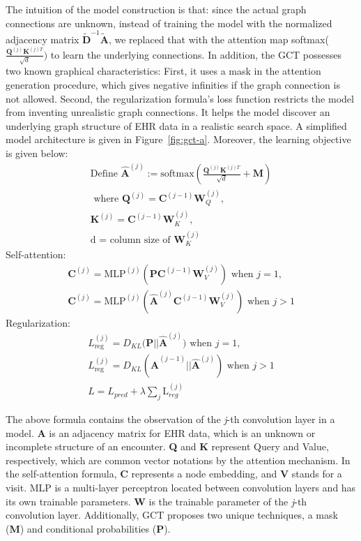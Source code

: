 \documentclass[11pt,a4paper]{article}
\begin{document}
The intuition of the model construction is that: since the actual graph connections are unknown, instead of training the model with the normalized adjacency matrix $\tilde{\textbf{D}}^{-1}\tilde{\textbf{A}}$, we replaced that with the attention map softmax($\frac{\textbf{Q}^{(j)}\textbf{K}^{(j)T}}{\sqrt{d}})$ to learn the underlying connections. In addition, the GCT possesses two known graphical characteristics: First, it uses a mask in the attention generation procedure, which gives negative infinities if the graph connection is not allowed. Second, the regularization formula's loss function restricts the model from inventing unrealistic graph connections. It helps the model discover an underlying graph structure of EHR data in a realistic search space. A simplified model architecture is given in Figure~\ref{fig:gct-a}. Moreover, the learning objective is given below:
\begin{align*}
    \text{Define } \hat{\mathbf{A}}^{(j)} := \text{softmax} (\frac{\textbf{Q}^{(j)}\textbf{K}^{(j)T}}{\sqrt{d}} + \textbf{M} ) \\
    \text{ where } \textbf{Q}^{(j)} = \textbf{C}^{(j-1)}\textbf{W}_\textit{Q}^{(j)}, \\
    \textbf{K}^{(j)} = \textbf{C}^{(j-1)}\textbf{W}_\textit{K}^{(j)}, \\
    \text{d = column size of } \textbf{W}_\textit{K}^{(j)}
\end{align*}
Self-attention:
\begin{gather*}
    \textbf{C}^{(j)} = \text{MLP}^{(j)}\left(\textbf{P}\textbf{C}^{(j-1)}\textbf{W}_\textit{V}^{(j)} \right) \text{ when } j = 1, \\
    \textbf{C}^{(j)} = \text{MLP}^{(j)}\left(\hat{\mathbf{A}}^{(j)}\textbf{C}^{(j-1)}\textbf{W}_\textit{V}^{(j)}\right) \text{ when } j > 1 
\end{gather*}
Regularization:
\begin{gather*}
    \textit{L}_\text{reg}^{(j)} = \textit{D}_\textit{KL} \textbf{(P}\vert\vert\hat{\mathbf{A}}^{(j)}\text{)} \text{ when } j = 1, \\
    \textit{L}_\text{reg}^{(j)} = \textit{D}_\textit{KL} (\hat{\mathbf{A}}^{(j-1)}\vert\vert\hat{\mathbf{A}}^{(j)}) \text{ when } j > 1 \\
    \textit{L} = \textit{L}_\textit{pred} + \lambda\sum_{j}\text{L}_\textit{reg}^{(j)}
\end{gather*}

The above formula contains the observation of the \textit{j}-th convolution layer in a model. \textbf{A} is an adjacency matrix for EHR data, which is an unknown or incomplete structure of an encounter. \textbf{Q} and \textbf{K} represent Query and Value, respectively, which are common vector notations by the attention mechanism. In the self-attention formula, \textbf{C} represents a node embedding, and \textbf{V} stands for a visit. MLP is a multi-layer perceptron located between convolution layers and has its own trainable parameters. \textbf{W} is the trainable parameter of the \textit{j}-th convolution layer. Additionally, GCT proposes two unique techniques, a mask (\textbf{M}) and conditional probabilities (\textbf{P}).
\end{document}
